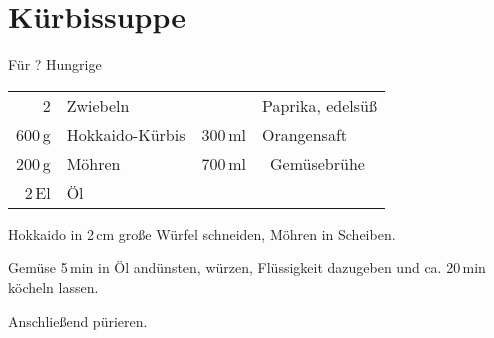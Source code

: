 \section*{K\"{u}rbissuppe}
\begin{centering}
F\"{u}r ? Hungrige
\end{centering}
\begin{table}[H]
\centering
\begin{tabular*}{1\textwidth}{rlrl}
2 & Zwiebeln &&Paprika, edels\"{u}{\ss} \\
600\,g & Hokkaido-K\"{u}rbis & 300\,ml & Orangensaft\\
200\,g & M\"{o}hren & 700\,ml &\ Gem\"{u}sebr\"{u}he \\
2\,El & \"{O}l &&\\
\end{tabular*}
\end{table}
\begin{Notes}
\item Hokkaido in 2\,cm gro{\ss}e W\"{u}rfel schneiden, M\"{o}hren in Scheiben.
\item Gem\"{u}se 5\,min in \"{O}l and\"{u}nsten, w\"{u}rzen, Fl\"{u}ssigkeit
dazugeben und ca. 20\,min k\"{o}cheln lassen.
\item Anschlie{\ss}end p\"{u}rieren.
\end{Notes}




